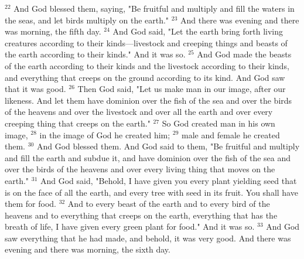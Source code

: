 $^{22}$ And God blessed them, saying, "Be fruitful and multiply and fill the waters in the seas, and let birds multiply on the earth."
$^{23}$ And there was evening and there was morning, the fifth day.
$^{24}$ And God said, "Let the earth bring forth living creatures according to their kinds—livestock and creeping things and beasts of the earth according to their kinds." And it was so.
$^{25}$ And God made the beasts of the earth according to their kinds and the livestock according to their kinds, and everything that creeps on the ground according to its kind. And God saw that it was good.
$^{26}$ Then God said, "Let us make man in our image, after our likeness. And let them have dominion over the fish of the sea and over the birds of the heavens and over the livestock and over all the earth and over every creeping thing that creeps on the earth."
$^{27}$ So God created man in his own image,
$^{28}$ in the image of God he created him;
$^{29}$ male and female he created them.
$^{30}$ And God blessed them. And God said to them, "Be fruitful and multiply and fill the earth and subdue it, and have dominion over the fish of the sea and over the birds of the heavens and over every living thing that moves on the earth."
$^{31}$ And God said, "Behold, I have given you every plant yielding seed that is on the face of all the earth, and every tree with seed in its fruit. You shall have them for food.
$^{32}$ And to every beast of the earth and to every bird of the heavens and to everything that creeps on the earth, everything that has the breath of life, I have given every green plant for food." And it was so.
$^{33}$ And God saw everything that he had made, and behold, it was very good. And there was evening and there was morning, the sixth day.